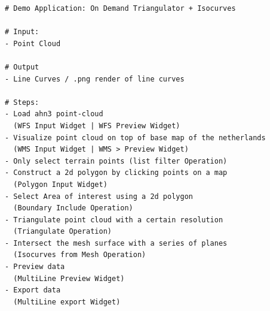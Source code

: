 \begin{lstlisting}
# Demo Application: On Demand Triangulator + Isocurves

# Input: 
- Point Cloud

# Output
- Line Curves / .png render of line curves

# Steps: 
- Load ahn3 point-cloud 
  (WFS Input Widget | WFS Preview Widget)
- Visualize point cloud on top of base map of the netherlands 
  (WMS Input Widget | WMS > Preview Widget)
- Only select terrain points (list filter Operation)
- Construct a 2d polygon by clicking points on a map 
  (Polygon Input Widget)
- Select Area of interest using a 2d polygon 
  (Boundary Include Operation)
- Triangulate point cloud with a certain resolution 
  (Triangulate Operation)
- Intersect the mesh surface with a series of planes 
  (Isocurves from Mesh Operation)
- Preview data 
  (MultiLine Preview Widget)
- Export data 
  (MultiLine export Widget)
\end{lstlisting}
